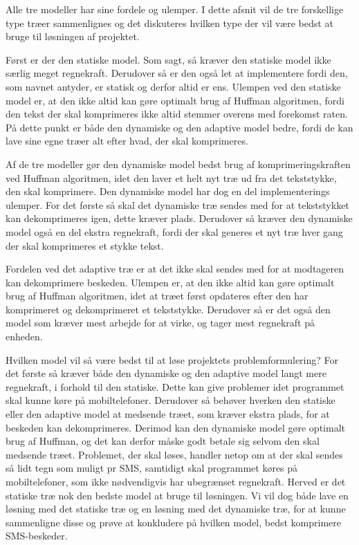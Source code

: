 Alle tre modeller har sine fordele og ulemper. I dette afsnit vil de tre forskellige type træer sammenlignes og det diskuteres hvilken type der vil være bedst at bruge til løsningen af projektet.

Først er der den statiske model. Som sagt, så kræver den statiske model ikke særlig meget regnekraft. Derudover så er den også let at implementere fordi den, som navnet antyder, er statisk og derfor altid er ens. Ulempen ved den statiske model er, at den ikke altid kan gøre optimalt brug af Huffman algoritmen, fordi den tekst der skal komprimeres ikke altid stemmer overens med forekomst raten. På dette punkt er både den dynamiske og den adaptive model bedre, fordi de kan lave sine egne træer alt efter hvad, der skal komprimeres.

Af de tre modeller gør den dynamiske model bedst brug af komprimeringskraften ved Huffman algoritmen, idet den laver et helt nyt træ ud fra det tekststykke, den skal komprimere. Den dynamiske model har dog en del implementerings ulemper. For det første så skal det dynamiske træ sendes med for at tekststykket kan dekomprimeres igen, dette kræver plads. Derudover så kræver den dynamiske model også en del ekstra regnekraft, fordi der skal generes et nyt træ hver gang der skal komprimeres et stykke tekst.

Fordelen ved det adaptive træ er at det ikke skal sendes med for at modtageren kan dekomprimere beskeden. Ulempen er, at den ikke altid kan gøre optimalt brug af Huffman algoritmen, idet at træet først opdateres efter den har komprimeret og dekomprimeret et tekststykke. Derudover så er det også den model som kræver mest arbejde for at virke, og tager mest regnekraft på enheden.

Hvilken model vil så være bedst til at løse projektets problemformulering? For det første så kræver både den dynamiske og den adaptive model langt mere regnekraft, i forhold til den statiske. Dette kan give problemer idet programmet skal kunne køre på mobiltelefoner. Derudover så behøver hverken den statiske eller den adaptive model at medsende træet, som kræver ekstra plads, for at beskeden kan dekomprimeres. Derimod kan den dynamiske model gøre optimalt brug af Huffman, og det kan derfor måske godt betale sig selvom den skal medsende træet. Problemet, der skal løses, handler netop om at der skal sendes så lidt tegn som muligt pr SMS, samtidigt skal programmet køres på mobiltelefoner, som ikke nødvendigvis har ubegrænset regnekraft. Herved er det statiske træ nok den bedste model at bruge til løsningen. Vi vil dog både lave en løsning med det statiske træ og en løsning med det dynamiske træ, for at kunne sammenligne disse og prøve at konkludere på hvilken model, bedst komprimere SMS-beskeder.